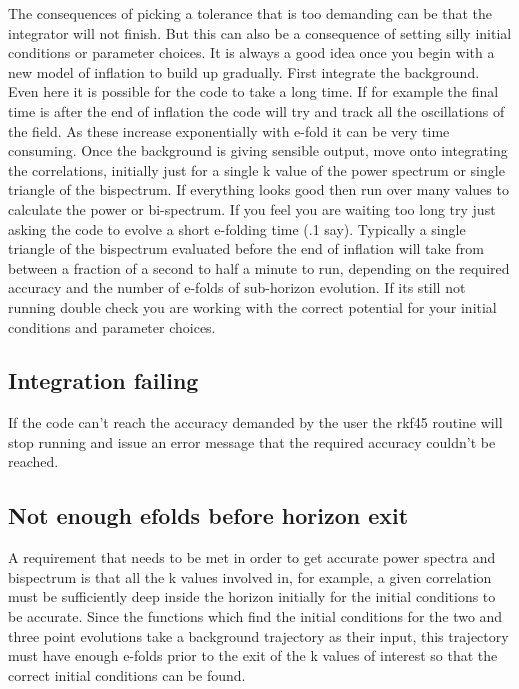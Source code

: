 \documentclass[10pt,
amsmath,amssymb,
aps,prd,nofootinbib,eqsecnum,a4paper]{revtex4}
\begin{document}
The consequences of picking a tolerance that is too demanding can be that the integrator will not finish. 
But this can also be a consequence of setting silly initial conditions or parameter choices. It is always a good idea 
once you begin with a new model of inflation to build up gradually. First integrate the background. Even here it 
is possible for the code to take a long time. If for example the final time is after the end of inflation the code will 
try and  track all the oscillations of the field. As these increase exponentially with e-fold it 
can be very time consuming. 
Once the background is giving sensible output, move onto integrating the correlations, 
initially just for a 
single k value of the power spectrum or single triangle of the bispectrum. If 
everything looks good then run over many values to calculate the power or bi-spectrum. If you feel you are waiting too long try just asking 
the code to evolve 
a short e-folding time (.1 say). Typically a single triangle of the bispectrum evaluated before the end of 
inflation will take 
from between a fraction of a second to half a minute to run, depending on the required accuracy and 
the number of e-folds 
of sub-horizon evolution. If its still not running double check you are working 
with the correct potential for your initial conditions and parameter choices.

\subsection{Integration failing}

If the code can't reach the accuracy demanded by the user the rkf45 routine will stop running and issue an error 
message that the required accuracy couldn't be reached. 

\subsection{Not enough efolds before horizon exit}

A requirement that needs to be met in order to get accurate power spectra and bispectrum is that all the k values 
involved in, for example, a given correlation must be sufficiently deep inside the horizon initially for the initial conditions to be accurate. Since the functions which find the initial conditions for the two and three point evolutions take a background 
trajectory as their input, this trajectory must have enough e-folds prior to the exit of the k values of 
interest so that the correct initial conditions can be found. 
\end{document}
